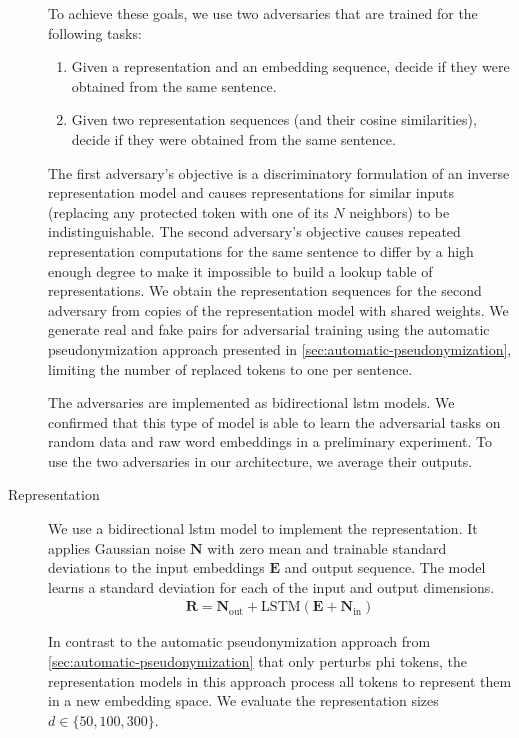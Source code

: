 \begin{description}
    To achieve these goals, we use two adversaries that are trained for the following tasks:
    \begin{enumerate}
        \item Given a representation and an embedding sequence, decide if they were obtained from the same sentence.
        \item Given two representation sequences (and their cosine similarities), decide if they were obtained from the same sentence.
    \end{enumerate}
    
    The first adversary's objective is a discriminatory formulation of an inverse representation model and causes representations for similar inputs (replacing any protected token with one of its $N$ neighbors) to be indistinguishable.
    The second adversary's objective causes repeated representation computations for the same sentence to differ by a high enough degree to make it impossible to build a lookup table of representations.
    We obtain the representation sequences for the second adversary from copies of the representation model with shared weights.
    We generate real and fake pairs for adversarial training using the automatic pseudonymization approach presented in \cref{sec:automatic-pseudonymization}, limiting the number of replaced tokens to one per sentence.
    
    The adversaries are implemented as bidirectional \ac{lstm} models.
    We confirmed that this type of model is able to learn the adversarial tasks on random data and raw word embeddings in a preliminary experiment.
    To use the two adversaries in our architecture, we average their outputs.
    
    \item[Representation]
    We use a bidirectional \ac{lstm} model to implement the representation.
    It applies Gaussian noise $\bm{N}$ with zero mean and trainable standard deviations to the input embeddings $\bm{E}$ and output sequence.
    The model learns a standard deviation for each of the input and output dimensions.
    \begin{align}
        \bm{R} = \bm{N}_{\text{out}} + \text{LSTM}(\bm{E} + \bm{N}_{\text{in}})
    \end{align}
    
    In contrast to the automatic pseudonymization approach from \cref{sec:automatic-pseudonymization} that only perturbs \ac{phi} tokens, the representation models in this approach process all tokens to represent them in a new embedding space.
    We evaluate the representation sizes $d \in \{50, 100, 300\}$. 
    

\end{description}
